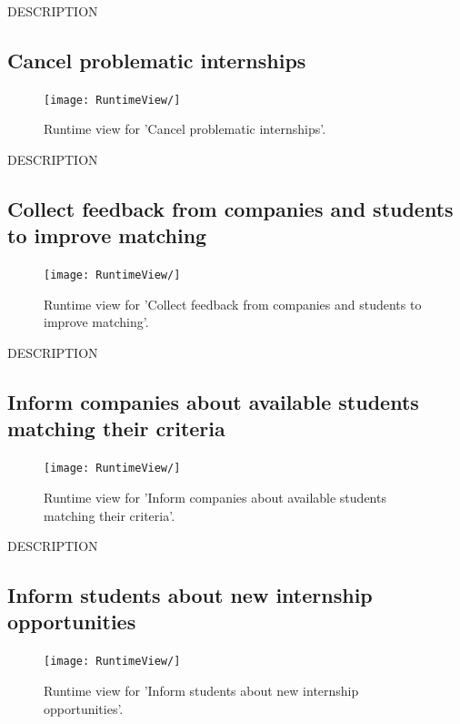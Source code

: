 DESCRIPTION


\subsection{Cancel problematic internships}
\begin{figure}[H]
    \begin{center}
        \texttt{[image: RuntimeView/]}
        \caption{Runtime view for 'Cancel problematic internships'.}
        \label{fig:runtime_modifybadge}%
    \end{center}
\end{figure}

DESCRIPTION


\subsection{Collect feedback from companies and students to improve matching}
\begin{figure}[H]
    \begin{center}
        \texttt{[image: RuntimeView/]}
        \caption{Runtime view for 'Collect feedback from companies and students to improve matching'.}
        \label{fig:runtime_modifybadge}%
    \end{center}
\end{figure}

DESCRIPTION


\subsection{Inform companies about available students matching their criteria}
\begin{figure}[H]
    \begin{center}
        \texttt{[image: RuntimeView/]}
        \caption{Runtime view for 'Inform companies about available students matching their criteria'.}
        \label{fig:runtime_modifybadge}%
    \end{center}
\end{figure}

DESCRIPTION


\subsection{Inform students about new internship opportunities}
\begin{figure}[H]
    \begin{center}
        \texttt{[image: RuntimeView/]}
        \caption{Runtime view for 'Inform students about new internship opportunities'.}
        \label{fig:runtime_modifybadge}%
    \end{center}
\end{figure}

